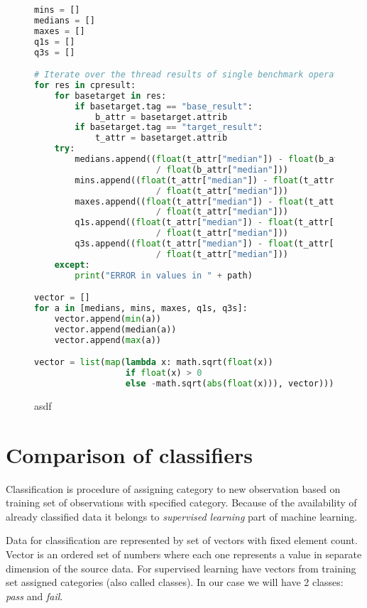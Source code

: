 \begin{figure}
  \small
  \begin{lstlisting}[language=Python]
mins = []
medians = []
maxes = []
q1s = []
q3s = []

# Iterate over the thread results of single benchmark operation
for res in cpresult:
    for basetarget in res:
        if basetarget.tag == "base_result":
            b_attr = basetarget.attrib
        if basetarget.tag == "target_result":
            t_attr = basetarget.attrib
    try:
        medians.append((float(t_attr["median"]) - float(b_attr["median"]))
                        / float(b_attr["median"]))
        mins.append((float(t_attr["median"]) - float(t_attr["min"]))
                        / float(t_attr["median"]))
        maxes.append((float(t_attr["median"]) - float(t_attr["max"]))
                        / float(t_attr["median"]))
        q1s.append((float(t_attr["median"]) - float(t_attr["first_q"]))
                        / float(t_attr["median"]))
        q3s.append((float(t_attr["median"]) - float(t_attr["third_q"]))
                        / float(t_attr["median"]))
    except:
        print("ERROR in values in " + path)

vector = []
for a in [medians, mins, maxes, q1s, q3s]:
    vector.append(min(a))
    vector.append(median(a))
    vector.append(max(a))

vector = list(map(lambda x: math.sqrt(float(x))
                  if float(x) > 0
                  else -math.sqrt(abs(float(x))), vector)))
  \end{lstlisting}
  \normalsize
  \caption{asdf}
  \label{fig:learn_preprocess}
\end{figure}

\section{Comparison of classifiers}
Classification is procedure of assigning category to new observation based on
training set of observations with specified category. Because of the
availability of already classified data it belongs to \emph{supervised learning}
part of machine learning.

Data for classification are represented by set of vectors with fixed element
count. Vector is an ordered set of numbers where each one represents a value in
separate dimension of the source data. For supervised learning have vectors from
training set assigned categories (also called classes). In our case we will have
2 classes: \emph{pass} and \emph{fail}.

